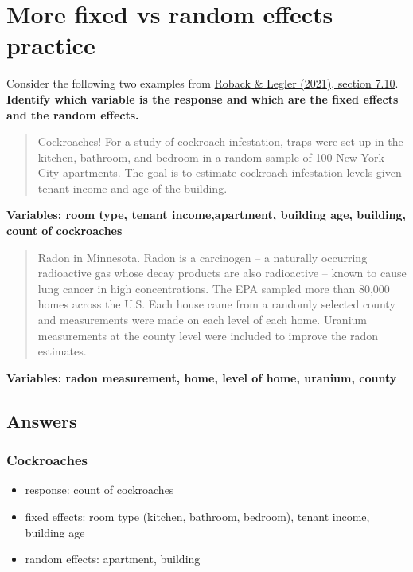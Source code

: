 \documentclass[
  openany]{book}
\providecommand{\tightlist}{%
  \setlength{\itemsep}{0pt}\setlength{\parskip}{0pt}}
\begin{document}
\hypertarget{more-fixed-vs-random-effects-practice}{%
\section{More fixed vs random effects practice}\label{more-fixed-vs-random-effects-practice}}

Consider the following two examples from \href{https://bookdown.org/roback/bookdown-BeyondMLR/ch-corrdata.html\#exercises-6}{Roback \& Legler (2021), section 7.10}.
\textbf{Identify which variable is the response and which are the fixed effects and the random effects.}

\begin{quote}
Cockroaches! For a study of cockroach infestation, traps were set up in the kitchen, bathroom, and bedroom in a random sample of 100 New York City apartments. The goal is to estimate cockroach infestation levels given tenant income and age of the building.
\end{quote}

\textbf{Variables: room type, tenant income,apartment, building age, building, count of cockroaches}

\begin{quote}
Radon in Minnesota. Radon is a carcinogen -- a naturally occurring radioactive gas whose decay products are also radioactive -- known to cause lung cancer in high concentrations. The EPA sampled more than 80,000 homes across the U.S. Each house came from a randomly selected county and measurements were made on each level of each home. Uranium measurements at the county level were included to improve the radon estimates.
\end{quote}

\textbf{Variables: radon measurement, home, level of home, uranium, county}

\hypertarget{answers}{%
\subsection{Answers}\label{answers}}

\hypertarget{cockroaches}{%
\subsubsection{Cockroaches}\label{cockroaches}}

\begin{itemize}
\tightlist
\item
  response: count of cockroaches
\item
  fixed effects: room type (kitchen, bathroom, bedroom), tenant income, building
  age
\item
  random effects: apartment, building
\end{itemize}
\end{document}
